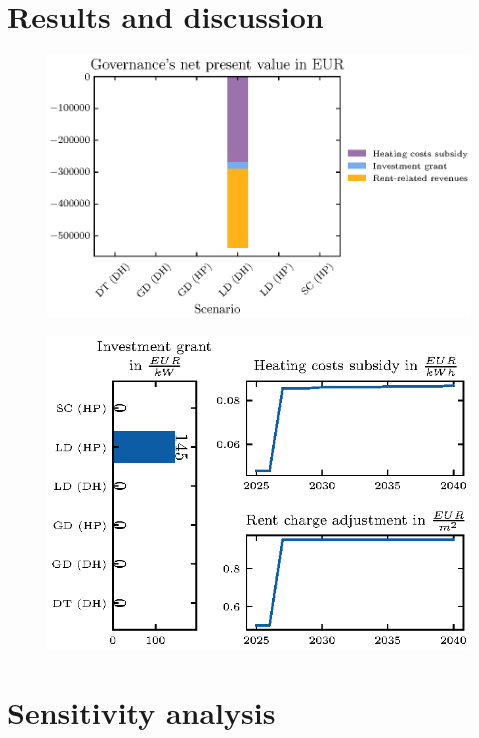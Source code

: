 \section{Results and discussion}\label{results}

\begin{figure}[h]
	\centering
	\includegraphics[width=1\linewidth]{figures/4_Results/fig_npv_comparison/net_present_value.eps}
	\caption{}
	\label{fig:npv_comparison}
\end{figure}

\begin{figure}[h]
	\centering
	\includegraphics[width=1\linewidth]{figures/4_Results/fig_rent_subsidy_development/price_dev.eps}
	\caption{}
	\label{fig:sub_rent_dev}
\end{figure}



\section{Sensitivity analysis}

